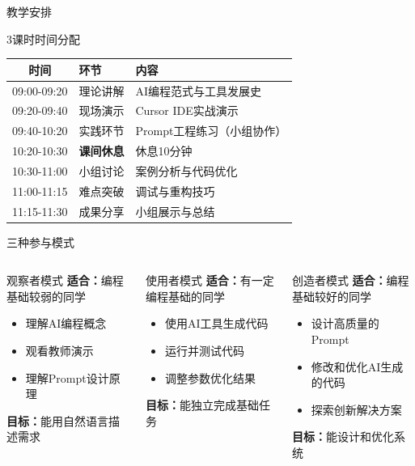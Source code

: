 \documentclass[aspectratio=169, 10pt]{beamer}
\begin{document}
\begin{frame}{教学安排}
	\begin{block}{3课时时间分配}
		\begin{table}
			\centering
			\small
			\begin{tabular}{cll}
				\toprule
				\textbf{时间} & \textbf{环节} & \textbf{内容} \\
				\midrule
				09:00-09:20 & 理论讲解 & AI编程范式与工具发展史 \\
				09:20-09:40 & 现场演示 & Cursor IDE实战演示 \\
				09:40-10:20 & 实践环节 & Prompt工程练习（小组协作） \\
				10:20-10:30 & \textbf{课间休息} & 休息10分钟 \\
				10:30-11:00 & 小组讨论 & 案例分析与代码优化 \\
				11:00-11:15 & 难点突破 & 调试与重构技巧 \\
				11:15-11:30 & 成果分享 & 小组展示与总结 \\
				\bottomrule
			\end{tabular}
		\end{table}
	\end{block}
\end{frame}

\begin{frame}{三种参与模式}
	\begin{columns}
		\begin{block}{观察者模式}
			\textbf{适合：}编程基础较弱的同学
			\begin{itemize}
				\item 理解AI编程概念
				\item 观看教师演示
				\item 理解Prompt设计原理
			\end{itemize}
			\textbf{目标：}能用自然语言描述需求
		\end{block}

		\begin{block}{使用者模式}
			\textbf{适合：}有一定编程基础的同学
			\begin{itemize}
				\item 使用AI工具生成代码
				\item 运行并测试代码
				\item 调整参数优化结果
			\end{itemize}
			\textbf{目标：}能独立完成基础任务
		\end{block}

		\begin{block}{创造者模式}
			\textbf{适合：}编程基础较好的同学
			\begin{itemize}
				\item 设计高质量的Prompt
				\item 修改和优化AI生成的代码
				\item 探索创新解决方案
			\end{itemize}
			\textbf{目标：}能设计和优化系统
		\end{block}
	\end{columns}
\end{frame}
\end{document}
